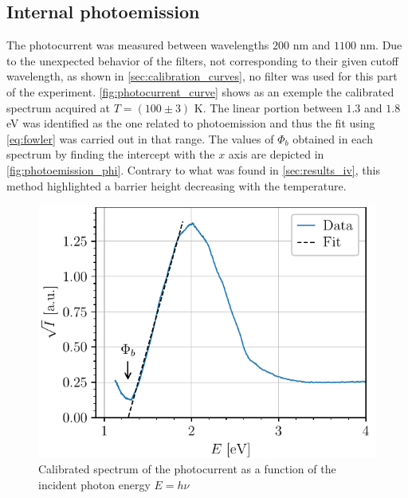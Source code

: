 \begin{figure}[htbp]
\begin{minipage}[t]{0.49\textwidth}
        \label{fig:richardson}
    \end{minipage}
\end{figure}

\subsection{Internal photoemission} \label{sec:results_photoemission}
The photocurrent was measured between wavelengths $200$ nm and $1100$ nm.
Due to the unexpected behavior of the filters, not corresponding to their given cutoff wavelength, as shown in \autoref{sec:calibration_curves}, no filter was used for this part of the experiment.
\autoref{fig:photocurrent_curve} shows as an exemple the calibrated spectrum acquired at $T = (100\pm3)$ K.
The linear portion between $1.3$ and $1.8$ eV was identified as the one related to photoemission and thus the fit using \autoref{eq:fowler} was carried out in that range.
The values of $\Phi_b$ obtained in each spectrum by finding the intercept with the $x$ axis are depicted in \autoref{fig:photoemission_phi}.
Contrary to what was found in  \autoref{sec:results_iv}, this method highlighted a barrier height decreasing with the temperature.
\begin{figure}[htbp]
    \centering
    \vspace{-0.2cm}
    \includegraphics[scale=1]{figures/photocurrent_curve.pdf}
    \caption{Calibrated spectrum of the photocurrent as a function of the incident photon energy $E=h\nu$}
    \label{fig:photocurrent_curve}
    \vspace{-1.5cm}
\end{figure}
